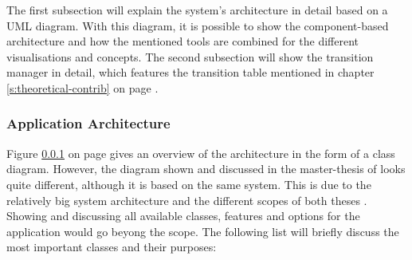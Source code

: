 The first subsection will explain the system's architecture in detail based on a \ac{UML} diagram. With this diagram, it is possible to show the component-based architecture and how the mentioned tools are combined for the different visualisations and concepts. The second subsection will show the transition manager in detail, which features the transition table mentioned in chapter \ref{s:theoretical-contrib} on page \pageref{s:theoretical-contrib}.



\subsubsection{Application Architecture}
Figure \ref{} on page \pageref{} gives an overview of the architecture in the form of a class diagram. However, the diagram shown and discussed in the master-thesis of \citeauthor{Wanko2016} looks quite different, although it is based on the same system. This is due to the relatively big system architecture and the different scopes of both theses . Showing and discussing all available classes, features and options for the application would go beyong the scope. The following list will briefly discuss the most important classes and their purposes:


